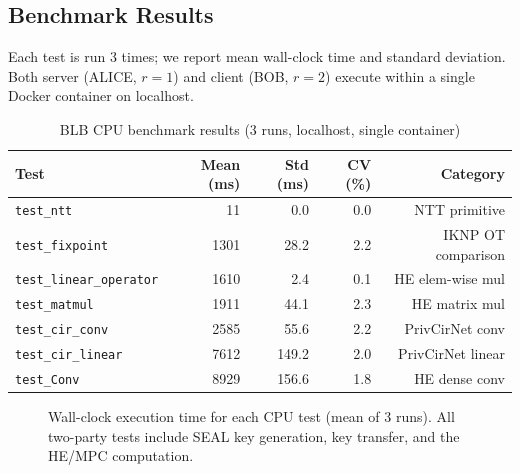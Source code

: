 \subsection{Benchmark Results}

Each test is run 3 times; we report mean wall-clock time and standard deviation.
Both server (ALICE, $r{=}1$) and client (BOB, $r{=}2$) execute within a single Docker container on localhost.

\begin{table}[h]
\centering
\caption{BLB CPU benchmark results (3 runs, localhost, single container)}
\label{tab:benchmarks}
\begin{tabular}{lrrrr}
\toprule
Test & Mean (ms) & Std (ms) & CV (\%) & Category \\
\midrule
\texttt{test\_ntt}              & 11      & 0.0   & 0.0 & NTT primitive \\
\texttt{test\_fixpoint}         & 1301    & 28.2  & 2.2 & IKNP OT comparison \\
\texttt{test\_linear\_operator} & 1610    & 2.4   & 0.1 & HE elem-wise mul \\
\texttt{test\_matmul}           & 1911    & 44.1  & 2.3 & HE matrix mul \\
\texttt{test\_cir\_conv}        & 2585    & 55.6  & 2.2 & PrivCirNet conv \\
\texttt{test\_cir\_linear}      & 7612    & 149.2 & 2.0 & PrivCirNet linear \\
\texttt{test\_Conv}             & 8929    & 156.6 & 1.8 & HE dense conv \\
\bottomrule
\end{tabular}
\end{table}

\begin{figure}[ht]
\centering
{}
\caption{Wall-clock execution time for each CPU test (mean of 3 runs). All two-party tests include SEAL key generation, key transfer, and the HE/MPC computation.}
\label{fig:benchmark-bar}
\end{figure}

